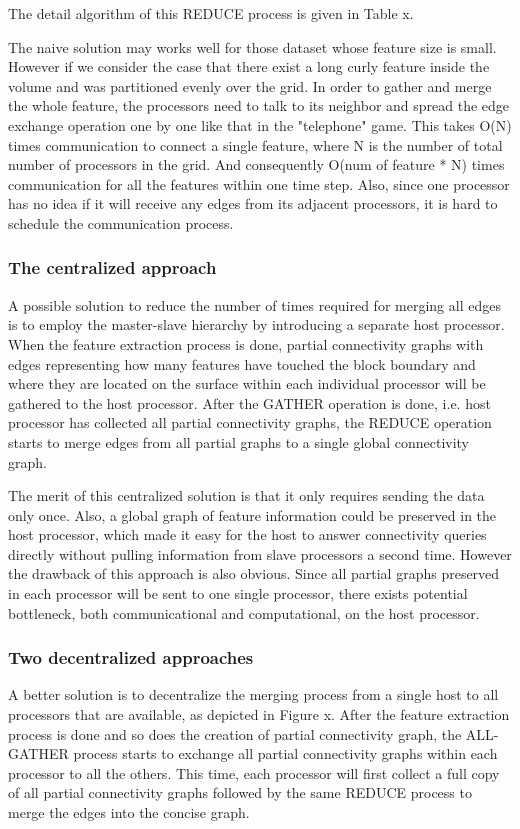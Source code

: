 \documentclass[10pt, conference, compsocconf]{IEEEtran}
\begin{document}
The detail algorithm of this REDUCE process is given in Table x.

The naive solution may works well for those dataset whose feature size is small. However if we consider the case that there exist a long curly feature inside the volume and was partitioned evenly over the grid. In order to gather and merge the whole feature, the processors need to talk to its neighbor and spread the edge exchange operation one by one like that in the "telephone" game. This takes O(N) times communication to connect a single feature, where N is the number of total number of processors in the grid. And consequently O(num of feature * N) times communication for all the features within one time step. Also, since one processor has no idea if it will receive any edges from its adjacent processors, it is hard to schedule the communication process.

\subsubsection{The centralized approach}
A possible solution to reduce the number of times required for merging all edges is to employ the master-slave hierarchy by introducing a separate host processor. When the feature extraction process is done, partial connectivity graphs with edges representing how many features have touched the block boundary and where they are located on the surface within each individual processor will be gathered to the host processor. After the GATHER operation is done, i.e. host processor has collected all partial connectivity graphs, the REDUCE operation starts to merge edges from all partial graphs to a single global connectivity graph.

The merit of this centralized solution is that it only requires sending the data only once. Also, a global graph of feature information could be preserved in the host processor, which made it easy for the host to answer connectivity queries directly without pulling information from slave processors a second time. However the drawback of this approach is also obvious. Since all partial graphs preserved in each processor will be sent to one single processor, there exists potential bottleneck, both communicational and computational, on the host processor.

\subsubsection{Two decentralized approaches}
A better solution is to decentralize the merging process from a single host to all processors that are available, as depicted in Figure x. After the feature extraction process is done and so does the creation of partial connectivity graph, the ALL-GATHER process starts to exchange all partial connectivity graphs within each processor to all the others. This time, each processor will first collect a full copy of all partial connectivity graphs followed by the same REDUCE process to merge the edges into the concise graph. 
\end{document}
